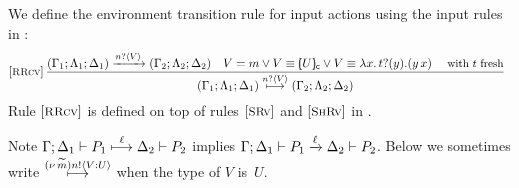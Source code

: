 \begin{definition}
	\label{def:rlts}
	We define the environment transition rule for input actions 
	using the input rules in :
	\[ \!\!\!
	\begin{array}{l}
			
						\eltsrule{RRcv}\,\tree {
	(\Gamma_1; \Lambda_1; \Delta_1) \by{\bactinp{n}{V}} (\Gamma_2; \Lambda_2; \Delta_2)
	\quad
					V = m 
					\vee  V \scong \omapchar{U}%
										\vee V  \scong \abs{{x}}{\binp{t}{y} (\appl{y}{{x}})}
					\text{ {\small with $t$ fresh}} 
			}{
				(\Gamma_1; \Lambda_1; \Delta_1) \hby{\bactinp{n}{V}} (\Gamma_2; \Lambda_2; \Delta_2)
			}
			
			
	\end{array}
	\]
	\noi Rule $\eltsrule{RRcv}$ is defined on top
	of rules $\eltsrule{SRv}$ and $\eltsrule{ShRv}$
	in .
\end{definition}

\noi Note 
$\Gamma; \Delta_1 \vdash P_1 \stackrel{\ell}{\longmapsto} \Delta_2 \vdash P_2$ implies  
$\Gamma; \Delta_1 \vdash P_1 \xrightarrow{\ell} \Delta_2 \vdash P_2$.
Below we sometimes write  
$\stackrel{(\nu\, \widetilde{m}) n ! \langle V : U \rangle}{\longmapsto}$
when the type of $V$ is~$U$.

